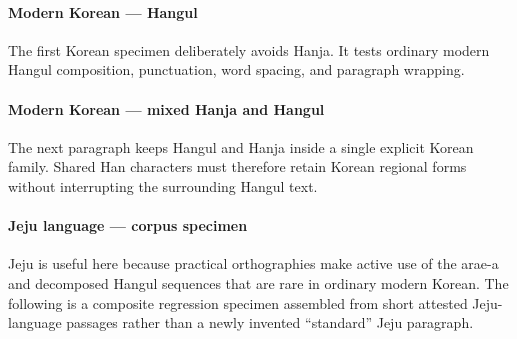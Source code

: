 \paragraph{Modern Korean --- Hangul}

The first Korean specimen deliberately avoids Hanja. It tests ordinary modern
Hangul composition, punctuation, word spacing, and paragraph wrapping.



\paragraph{Modern Korean --- mixed Hanja and Hangul}

The next paragraph keeps Hangul and Hanja inside a single explicit Korean
family. Shared Han characters must therefore retain Korean regional forms
without interrupting the surrounding Hangul text.



\paragraph{Jeju language --- corpus specimen}

Jeju is useful here because practical orthographies make active use of the
arae-a and decomposed Hangul sequences that are rare in ordinary modern
Korean. The following is a composite regression specimen assembled from
short attested Jeju-language passages rather than a newly invented
``standard'' Jeju paragraph.

